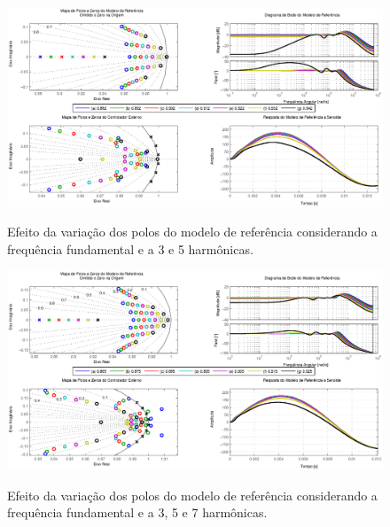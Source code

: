 \documentclass[repeatfields,oneside,overleaf]{tcc}
\begin{document}
\begin{figure}[!ht]
    \centering
    \caption{Efeito da variação dos polos do modelo de referência considerando a frequência fundamental e a 3{\textordfeminine} e 5{\textordfeminine} harmônicas.}
    \includegraphics[trim={80 20 80 10}, clip, width=\linewidth]{fig/f_5.eps}
    \\
\end{figure}

\begin{figure}[!ht]
    \centering
    \caption{Efeito da variação dos polos do modelo de referência considerando a frequência fundamental e a 3{\textordfeminine}, 5{\textordfeminine} e 7{\textordfeminine} harmônicas.}
    \includegraphics[trim={80 20 80 10}, clip, width=\linewidth]{fig/f_7.eps}
    \\
\end{figure}
\end{document}
